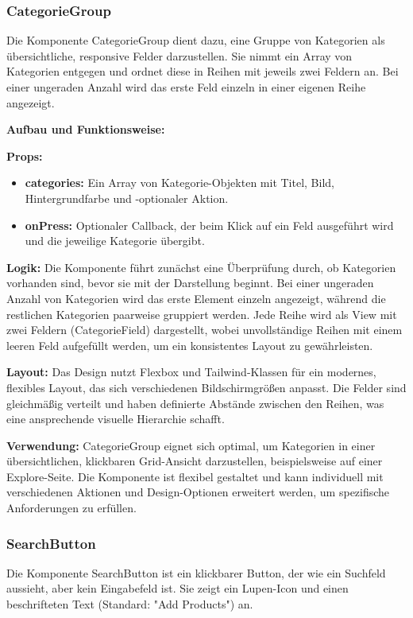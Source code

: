 \subsubsection{CategorieGroup}
Die Komponente CategorieGroup dient dazu, eine Gruppe von Kategorien als übersichtliche, responsive Felder darzustellen. Sie nimmt ein Array von Kategorien entgegen und ordnet diese in Reihen mit jeweils zwei Feldern an. Bei einer ungeraden Anzahl wird das erste Feld einzeln in einer eigenen Reihe angezeigt.

\noindent\textbf{Aufbau und Funktionsweise:}

\textbf{Props:}
\begin{itemize}
    \item \textbf{categories:} Ein Array von Kategorie-Objekten mit Titel, Bild, Hintergrundfarbe und -optionaler Aktion.
    \item \textbf{onPress:} Optionaler Callback, der beim Klick auf ein Feld ausgeführt wird und die jeweilige Kategorie übergibt.
\end{itemize}

\textbf{Logik:}
Die Komponente führt zunächst eine Überprüfung durch, ob Kategorien vorhanden sind, bevor sie mit der Darstellung beginnt. Bei einer ungeraden Anzahl von Kategorien wird das erste Element einzeln angezeigt, während die restlichen Kategorien paarweise gruppiert werden. Jede Reihe wird als View mit zwei Feldern (CategorieField) dargestellt, wobei unvollständige Reihen mit einem leeren Feld aufgefüllt werden, um ein konsistentes Layout zu gewährleisten.

\textbf{Layout:}
Das Design nutzt Flexbox und Tailwind-Klassen für ein modernes, flexibles Layout, das sich verschiedenen Bildschirmgrößen anpasst. Die Felder sind gleichmäßig verteilt und haben definierte Abstände zwischen den Reihen, was eine ansprechende visuelle Hierarchie schafft.

\noindent\textbf{Verwendung:} CategorieGroup eignet sich optimal, um Kategorien in einer übersichtlichen, klickbaren Grid-Ansicht darzustellen, beispielsweise auf einer Explore-Seite. Die Komponente ist flexibel gestaltet und kann individuell mit verschiedenen Aktionen und Design-Optionen erweitert werden, um spezifische Anforderungen zu erfüllen.

\subsubsection{SearchButton}
Die Komponente SearchButton ist ein klickbarer Button, der wie ein Suchfeld aussieht, aber kein Eingabefeld ist. Sie zeigt ein Lupen-Icon und einen beschrifteten Text (Standard: "Add Products") an.

